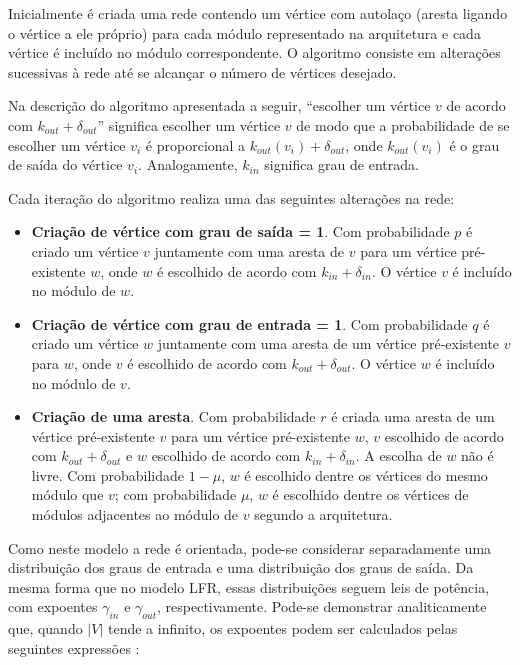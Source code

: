 \documentclass{acm_proc_article-sp}
\begin{document}
Inicialmente é criada uma rede contendo um vértice com autolaço (aresta ligando o vértice a ele próprio) para cada módulo representado na arquitetura e cada vértice é incluído no módulo correspondente. O algoritmo consiste em alterações sucessivas à rede até se alcançar o número de vértices desejado. 

Na descrição do algoritmo apresentada a seguir, ``escolher um vértice $v$ de acordo com $k_{out} + \delta_{out}$'' significa escolher um vértice $v$ de modo que a probabilidade de se escolher um vértice $v_i$ é proporcional a $k_{out}(v_i) + \delta_{out}$, onde $k_{out}(v_i)$ é o grau de saída do vértice $v_i$. Analogamente, $k_{in}$ significa grau de entrada.

Cada iteração do algoritmo realiza uma das seguintes alterações na rede:

\begin{itemize}
  \item \textbf{Criação de vértice com grau de saída = 1}. Com probabilidade $p$ é criado um vértice $v$ juntamente com uma aresta de $v$ para um vértice pré-existente $w$, onde $w$ é escolhido de acordo com $k_{in} + \delta_{in}$. O vértice $v$ é incluído no módulo de $w$.
  \item \textbf{Criação de vértice com grau de entrada = 1}. Com probabilidade $q$ é criado um vértice $w$ juntamente com uma aresta de um vértice pré-existente $v$ para $w$, onde $v$ é escolhido de acordo com $k_{out} + \delta_{out}$. O vértice $w$ é incluído no módulo de $v$.
  \item \textbf{Criação de uma aresta}. Com probabilidade $r$ é criada uma aresta de um vértice pré-existente $v$ para um vértice pré-existente $w$, $v$ escolhido de acordo com $k_{out} + \delta_{out}$ e $w$ escolhido de acordo com $k_{in} + \delta_{in}$. A escolha de $w$ não é livre. Com probabilidade $1 - \mu$, $w$ é escolhido dentre os vértices do mesmo módulo que $v$; com probabilidade $\mu$, $w$ é escolhido dentre os vértices de módulos adjacentes ao módulo de $v$ segundo a arquitetura. 
\end{itemize}

Como neste modelo a rede é orientada, pode-se considerar separadamente uma distribuição dos graus de entrada e uma distribuição dos graus de saída. Da mesma forma que no modelo LFR, essas distribuições seguem leis de potência, com expoentes $\gamma_{in}$ e $\gamma_{out}$, respectivamente. Pode-se demonstrar analiticamente que, quando $|V|$ tende a infinito, os expoentes podem ser calculados pelas seguintes expressões \cite{Bollobas2003}:
\end{document}
